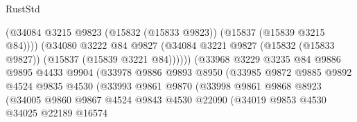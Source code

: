 \begin{lexlean}{RustStd}
\begin{coremodule}
                                        (@34084
                                          @3215
                                          @9823
                                          (@15832 (@15833 @9823))
                                          (@15837 (@15839 @3215 @84))))
                                      (@34080
                                        @3222
                                        @84
                                        @9827
                                        (@34084
                                          @3221
                                          @9827
                                          (@15832 (@15833 @9827))
                                          (@15837 (@15839 @3221 @84))))))
                                  (@33968
                                    @3229
                                    @3235
                                    @84
                                    @9886
                                    @9895
                                    @4433
                                    @9904
                                    (@33978
                                      @9886
                                      @9893
                                      @8950
                                      (@33985
                                        @9872
                                        @9885
                                        @9892
                                        @4524
                                        @9835
                                        @4530
                                        (@33993
                                          @9861
                                          @9870
                                          (@33998
                                            @9861
                                            @9868
                                            @8923
                                            (@34005
                                              @9860
                                              @9867
                                              @4524
                                              @9843
                                              @4530
                                              @22090
                                              (@34019
                                                @9853
                                                @4530
                                                @34025
                                                @22189
                                                @16574

\end{coremodule}
\end{lexlean}
